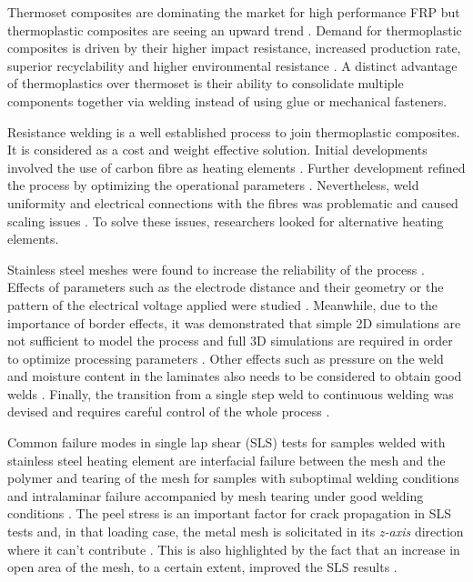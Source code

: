 \documentclass[11pt,review,times]{elsarticle}
\begin{document}
Thermoset composites are dominating the market for high performance FRP but thermoplastic composites are seeing an upward trend \cite{CompositeWorldSloan2018}. 
Demand for thermoplastic composites is driven by their higher impact resistance, increased production rate, superior recyclability and higher environmental resistance \cite{cogswell1992}. 
A distinct advantage of thermoplastics over thermoset is their ability to consolidate multiple components together via welding instead of using glue or mechanical fasteners. 

Resistance welding is a well established process to join thermoplastic composites. 
It is considered as a cost and weight effective solution. 
Initial developments involved the use of carbon fibre as heating elements \cite{houghton1984bonding,Eveno1988}.
Further development refined the process by optimizing the operational parameters \cite{Ageorges2000a}. 
Nevertheless, weld uniformity and electrical connections with the fibres was problematic and caused scaling issues \cite{McKnight1997}. 
To solve these issues, researchers looked for alternative heating elements.

Stainless steel meshes were found to increase the reliability of the process \cite{Hou1999a}. 
Effects of parameters such as the electrode distance and their geometry or the pattern of the electrical voltage applied were studied \cite{Dube2007}. 
Meanwhile, due to the importance of border effects, it was demonstrated that simple 2D simulations are not sufficient to model the process and full 3D simulations are required in order to optimize processing parameters  \cite{Talbot2013}. 
Other effects such as pressure on the weld and moisture content in the laminates also needs to be considered to obtain good welds \cite{Shi2014}.
Finally, the transition from a single step weld to continuous welding was devised and requires careful control of the whole process \cite{Shi2015a}. 

Common failure modes in single lap shear (SLS) tests for samples welded with stainless steel heating element are interfacial failure between the mesh and the polymer and tearing of the mesh for samples with suboptimal welding conditions and intralaminar failure accompanied by mesh tearing under good welding conditions \cite{Shi2014}. 
The peel stress is an important factor for crack propagation in SLS tests and, in that loading case, the metal mesh is solicitated in its \textit{z-axis} direction where it can't contribute \cite{Dube2008b}. 
This is also highlighted by the fact that an increase in open area of the mesh, to a certain extent, improved the SLS results \cite{Dube2012a}.
\end{document}
